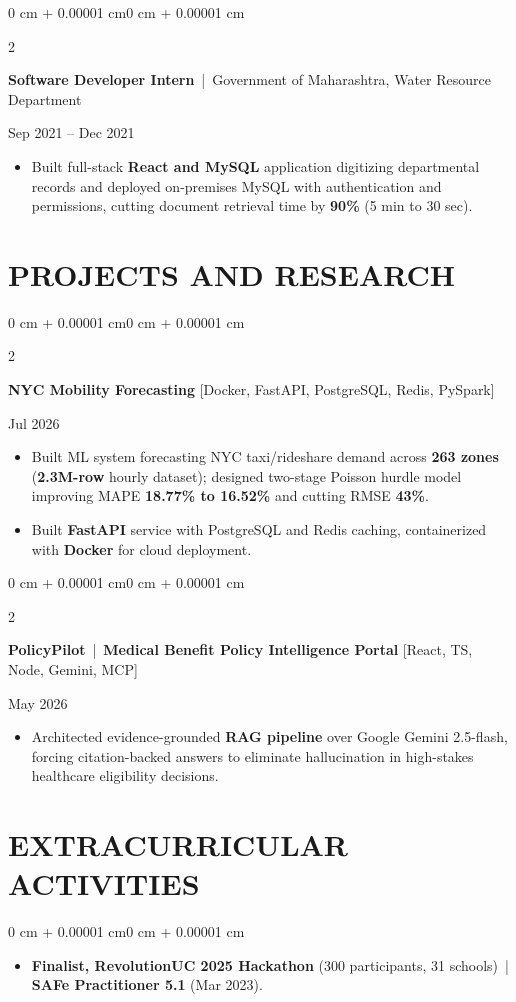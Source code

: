 \documentclass[10pt, letterpaper]{article}
\newenvironment{highlights}{
    \begin{itemize}[
        topsep=0.10 cm,
        parsep=0.06 cm,
        partopsep=0pt,
        itemsep=0.06 cm,
        leftmargin=12pt
    ]
}{
    \end{itemize}
}
\newenvironment{onecolentry}{
    \begin{adjustwidth}{0 cm + 0.00001 cm}{0 cm + 0.00001 cm}
}{
    \end{adjustwidth}
}
\newenvironment{twocolentry}[2][]{
    \onecolentry
    \def\secondColumn{#2}
    \setcolumnwidth{\fill, 4.5 cm}
    \begin{paracol}{2}
}{
    \switchcolumn \raggedleft \secondColumn
    \end{paracol}
    \endonecolentry
}
\begin{document}
\vspace{0.15 cm}

\begin{twocolentry}{Sep 2021 -- Dec 2021}
\textbf{Software Developer Intern} \,|\, Government of Maharashtra, Water Resource Department
\end{twocolentry}
\begin{highlights}
  \item Built full-stack \textbf{React and MySQL} application digitizing departmental records and deployed on-premises MySQL with authentication and permissions, cutting document retrieval time by \textbf{90\%} (5 min to 30 sec).
\end{highlights}

\section{PROJECTS AND RESEARCH}
\begin{twocolentry}{Jul 2026}
\textbf{NYC Mobility Forecasting} [Docker, FastAPI, PostgreSQL, Redis, PySpark]
\end{twocolentry}
\begin{highlights}
  \item Built ML system forecasting NYC taxi/rideshare demand across \textbf{263 zones} (\textbf{2.3M-row} hourly dataset); designed two-stage Poisson hurdle model improving MAPE \textbf{18.77\% to 16.52\%} and cutting RMSE \textbf{43\%}.
  \item Built \textbf{FastAPI} service with PostgreSQL and Redis caching, containerized with \textbf{Docker} for cloud deployment.
\end{highlights}

\vspace{0.12 cm}

\begin{twocolentry}{May 2026}
\textbf{PolicyPilot} \,|\, \textbf{Medical Benefit Policy Intelligence Portal} [React, TS, Node, Gemini, MCP]
\end{twocolentry}
\begin{highlights}
  \item Architected evidence-grounded \textbf{RAG pipeline} over Google Gemini 2.5-flash, forcing citation-backed answers to eliminate hallucination in high-stakes healthcare eligibility decisions.
\end{highlights}

\section{EXTRACURRICULAR ACTIVITIES}
\begin{onecolentry}
\begin{highlights}
  \item \textbf{Finalist, RevolutionUC 2025 Hackathon} (300 participants, 31 schools) \,|\, \textbf{SAFe Practitioner 5.1} (Mar 2023).
\end{highlights}
\end{onecolentry}
\end{document}

